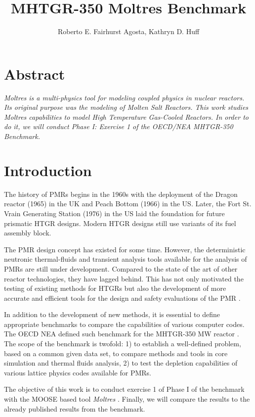 \documentclass{anstrans}
\title{MHTGR-350 Moltres Benchmark}
\author{Roberto E. Fairhurst Agosta, Kathryn D. Huff}
\institute{
University of Illinois at Urbana-Champaign, Dept. of Nuclear, Plasma, and Radiological Engineering\\
ref3@illinois.edu
}
\begin{document}

\section{Abstract}

\textit{
Moltres is a multi-physics tool for modeling coupled physics in nuclear reactors.
Its original purpose was the modeling of Molten Salt Reactors.
This work studies Moltres capabilities to model High Temperature Gas-Cooled Reactors.
In order to do it, we will conduct Phase I: Exercise 1 of the OECD/NEA MHTGR-350 Benchmark.
}

\section{Introduction}

The history of \glspl{PMR} begins in the 1960s with the deployment of the Dragon reactor (1965) in the \gls{UK} and Peach Bottom (1966) in the \gls{US}.
Later, the Fort St. Vrain Generating Station (1976) in the \gls{US} laid the foundation for future prismatic \gls{HTGR} designs.
Modern \gls{HTGR} designs still use variants of its fuel assembly block.

The \gls{PMR} design concept has existed for some time.
However, the deterministic neutronic thermal-fluids and transient analysis tools available for the analysis of \glspl{PMR} are still under development.
Compared to the state of the art of other reactor technologies, they have lagged behind.
This has not only motivated the testing of existing methods for \glspl{HTGR} but also the development of more accurate and efficient tools for the design and safety evaluations of the \gls{PMR} \cite{oecd_nea_benchmark_2017}.

In addition to the development of new methods, it is essential to define appropriate benchmarks to compare the capabilities of various computer codes.
The \gls{OECD} \gls{NEA} defined such benchmark for the \gls{MHTGR}-350 MW reactor \cite{oecd_nea_benchmark_2017}.
The scope of the benchmark is twofold: 1) to establish a well-defined problem, based on a common given data set, to compare methods and tools in core simulation and thermal fluids analysis, 2) to test the depletion capabilities of various lattice physics codes available for \glspl{PMR}.

The objective of this work is to conduct exercise 1 of Phase I of the benchmark with the \gls{MOOSE} \cite{gaston_physics-based_2015} based tool \textit{Moltres} \cite{lindsay_introduction_2018}.
Finally, we will compare the results to the already published results from the benchmark.
\end{document}
